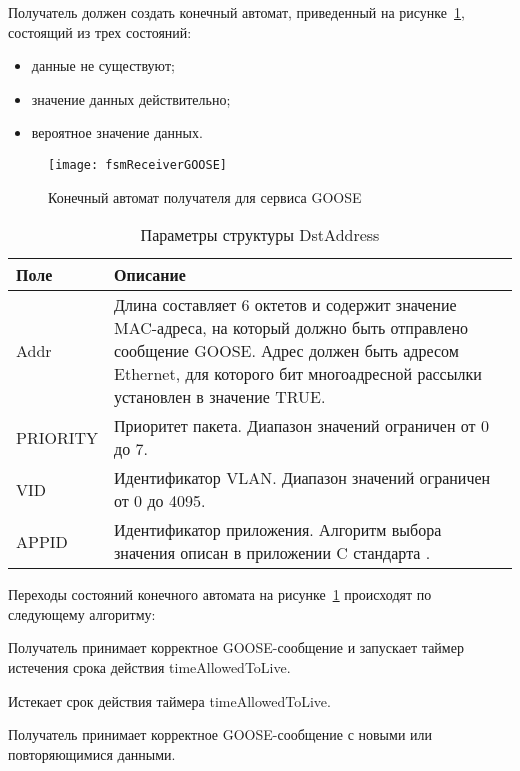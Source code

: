 Получатель должен создать конечный автомат, приведенный
на рисунке~\ref{pic::domain::fsm_receiver_goose}, состоящий из трех состояний:
\begin{itemize}
    \item данные не существуют;
    \item значение данных действительно;
    \item вероятное значение данных.
\end{itemize}

\begin{figure}[ht]
    \centering
    \texttt{[image: fsmReceiverGOOSE]}
    \caption{Конечный автомат получателя для сервиса GOOSE}
    \label{pic::domain::fsm_receiver_goose}
\end{figure}

\fixTableSectionSpace

\begin{table}[ht]
    \caption{Параметры структуры DstAddress}
    \label{table:domain:dst_addr_types}
    \begin{tabular}{| >{\raggedright}m{}
                    | >{\raggedright\arraybackslash}m{}|}
        \hline
        \centering Поле & \centering\arraybackslash Описание \\

        \hline
        Addr &
        Длина составляет 6 октетов и содержит значение MAC-адреса, на который
        должно быть отправлено сообщение GOOSE. Адрес должен быть адресом Ethernet,
        для которого бит многоадресной рассылки установлен в значение TRUE. \\

        \hline
        PRIORITY & Приоритет пакета. Диапазон значений ограничен от 0 до 7. \\

        \hline
        VID & Идентификатор VLAN. Диапазон значений ограничен от 0 до 4095. \\

        \hline
        APPID & Идентификатор приложения. Алгоритм выбора значения описан
        в приложении C стандарта \iecStdRef81. \\

        \hline
    \end{tabular}
\end{table}


Переходы состояний конечного автомата на
рисунке~\ref{pic::domain::fsm_receiver_goose} происходят по следующему алгоритму:
\begin{enumerate_num}
    \item Получатель принимает корректное GOOSE-сообщение и запускает таймер
    истечения срока действия timeAllowedToLive.
    \item Истекает срок действия таймера timeAllowedToLive.
    \item Получатель принимает корректное GOOSE-сообщение с новыми или
    повторяющимися данными.
\end{enumerate_num}

